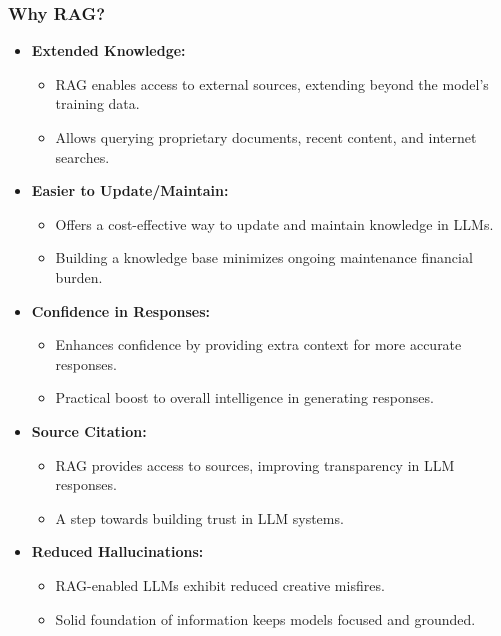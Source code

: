 \begin{frame}[fragile]\frametitle{Why RAG?}
\begin{itemize}
  \item \textbf{Extended Knowledge:}
    \begin{itemize}
      \item RAG enables access to external sources, extending beyond the model's training data.
      \item Allows querying proprietary documents, recent content, and internet searches.
    \end{itemize}

  \item \textbf{Easier to Update/Maintain:}
    \begin{itemize}
      \item Offers a cost-effective way to update and maintain knowledge in LLMs.
      \item Building a knowledge base minimizes ongoing maintenance financial burden.
    \end{itemize}

  \item \textbf{Confidence in Responses:}
    \begin{itemize}
      \item Enhances confidence by providing extra context for more accurate responses.
      \item Practical boost to overall intelligence in generating responses.
    \end{itemize}

  \item \textbf{Source Citation:}
    \begin{itemize}
      \item RAG provides access to sources, improving transparency in LLM responses.
      \item A step towards building trust in LLM systems.
    \end{itemize}

  \item \textbf{Reduced Hallucinations:}
    \begin{itemize}
      \item RAG-enabled LLMs exhibit reduced creative misfires.
      \item Solid foundation of information keeps models focused and grounded.
    \end{itemize}

\end{itemize}

\end{frame}

